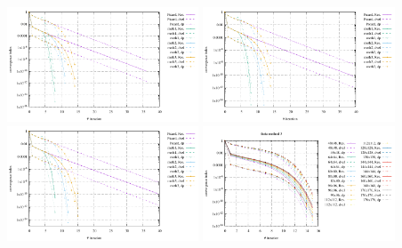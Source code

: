 \begin{center}
\includegraphics[width=5.7cm]{python_codes/fieldstone_87/results/experiment_06/conv_48x48.pdf}
\includegraphics[width=5.7cm]{python_codes/fieldstone_87/results/experiment_06/conv_64x64.pdf}\\
\includegraphics[width=5.7cm]{python_codes/fieldstone_87/results/experiment_06/conv_80x80.pdf}
\includegraphics[width=5.7cm]{python_codes/fieldstone_87/results/experiment_06/conv_meth3.pdf}
\end{center}

